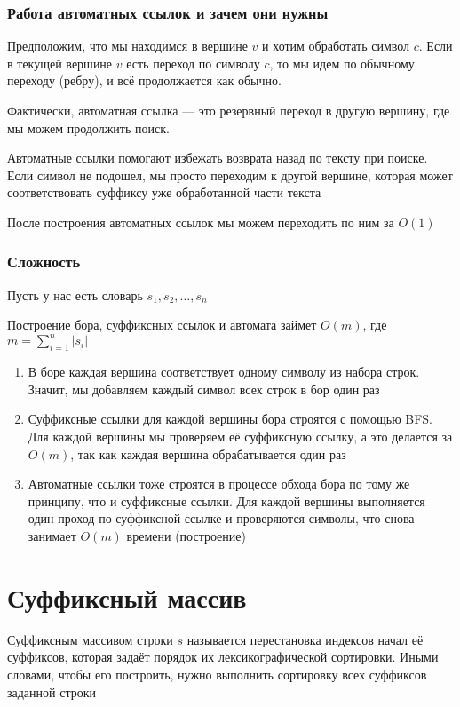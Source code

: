 \documentclass[a4paper]{article}
\begin{document}
\subsubsection{Работа автоматных ссылок и зачем они нужны}
Предположим, что мы находимся в вершине $v$ и хотим обработать символ $c$. Если в текущей вершине $v$ есть переход по символу $c$, то мы идем по обычному переходу (ребру), и всё продолжается как обычно.

Фактически, автоматная ссылка — это резервный переход в другую вершину, где мы можем продолжить поиск.

Автоматные ссылки помогают избежать возврата назад по тексту при поиске. Если символ не подошел, мы просто переходим к другой вершине, которая может соответствовать суффиксу уже обработанной части текста

\difficulty После построения автоматных ссылок мы можем переходить по ним за $O(1)$

\subsubsection{Сложность}
Пусть у нас есть словарь $s_1,s_2,\ldots,s_n$

Построение бора, суффиксных ссылок и автомата займет $O(m)$, где $m=\displaystyle\sum_{i=1}^{n} |s_i|$

\begin{enumerate}
    \item В боре каждая вершина соответствует одному символу из набора строк. Значит, мы добавляем каждый символ всех строк в бор один раз
    \item Суффиксные ссылки для каждой вершины бора строятся с помощью BFS. Для каждой вершины мы проверяем её суффиксную ссылку, а это делается за $O(m)$, так как каждая вершина обрабатывается один раз
    \item Автоматные ссылки тоже строятся в процессе обхода бора по тому же принципу, что и суффиксные ссылки. Для каждой вершины выполняется один проход по суффиксной ссылке и проверяются символы, что снова занимает $O(m)$ времени (построение)
\end{enumerate}

\newpage
\section{Суффиксный массив}
Суффиксным массивом строки $s$ называется перестановка индексов начал её суффиксов, которая задаёт порядок их лексикографической сортировки. Иными словами, чтобы его построить, нужно выполнить сортировку всех суффиксов заданной строки
\end{document}
